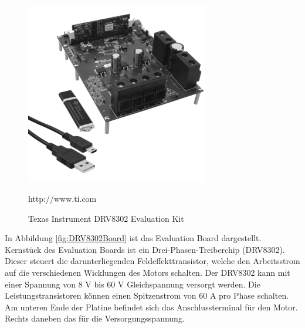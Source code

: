 \begin{figure}[h]
	\centering
	\includegraphics[width=8cm]{hardware/graphics/1189086_BB_00_FB}
	\caption[DRV8302 Evaluation Kit]{Texas Instrument DRV8302 Evaluation Kit}
	\quelle http://www.ti.com
	\label{fig:DRV8302EvalKit}
\end{figure}

In Abbildung \ref{fig:DRV8302Board} ist das Evaluation Board dargestellt.
Kernstück des Evaluation Boards ist ein Drei-Phasen-Treiberchip (DRV8302).
Dieser steuert die darunterliegenden Feldeffekttransistor, welche den Arbeitsstrom auf die verschiedenen Wicklungen des Motors schalten.
Der DRV8302 kann mit einer Spannung von 8 V bis 60 V Gleichspannung versorgt werden.
Die Leistungstransistoren können einen Spitzenstrom von 60 A pro Phase schalten.
Am unteren Ende der Platine befindet sich das Anschlussterminal für den Motor.
Rechts daneben das für die Versorgungsspannung.\\

